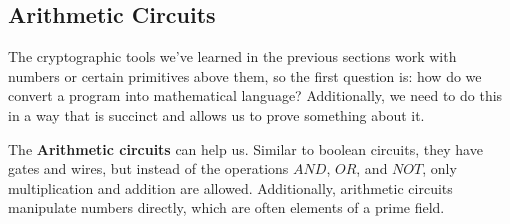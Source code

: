 \documentclass[../lecture-notes.tex]{subfiles}
\begin{document}
\subsection{Arithmetic Circuits}
The cryptographic tools we've learned in the previous sections work with numbers or certain 
primitives above them, so the first question is: how do we convert a program into mathematical 
language? Additionally, we need to do this in a way that is succinct and allows us to prove 
something about it.

The \textbf{Arithmetic circuits} can help us. Similar to boolean circuits, they have gates and 
wires, but instead of the operations $AND$, $OR$, and $NOT$, only multiplication and addition are 
allowed. Additionally, arithmetic circuits manipulate numbers directly, which are often elements of
a prime field.



\end{document}
